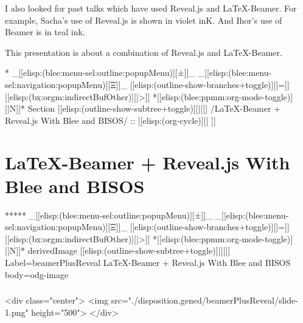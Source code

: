 \begin{whenOrg}
\begin{verblatex}
\begin{frame}[fragile,plain,label=priorArt]
{  I also looked for past talks which have used Reveal.js and LaTeX-Beamer.
  For example, Sacha's use of Reveal.js is shown in violet inK.
  And Ihor's use of Beamer is in teal ink.

  This presentation is about a combination of Reveal.js and LaTeX-Beamer.
}

\end{frame}
\end{verblatex}


\begin{whenOrg}
*  _[[elisp:(blee:menu-sel:outline:popupMenu)][±]]_ _[[elisp:(blee:menu-sel:navigation:popupMenu)][Ξ]]_ [[elisp:(outline-show-branches+toggle)][|=]] [[elisp:(bx:orgm:indirectBufOther)][|>]] *[[elisp:(blee:ppmm:org-mode-toggle)][|N]]*  Section    [[elisp:(outline-show-subtree+toggle)][||]]   /LaTeX-Beamer + Reveal.js With Blee and BISOS/ ::  [[elisp:(org-cycle)][| ]]
\end{whenOrg}

\section{LaTeX-Beamer + Reveal.js With Blee and BISOS}


\begin{whenOrg}
*****  _[[elisp:(blee:menu-sel:outline:popupMenu)][±]]_ _[[elisp:(blee:menu-sel:navigation:popupMenu)][Ξ]]_ [[elisp:(outline-show-branches+toggle)][|=]] [[elisp:(bx:orgm:indirectBufOther)][|>]] *[[elisp:(blee:ppmm:org-mode-toggle)][|N]]*  derivedImage [[elisp:(outline-show-subtree+toggle)][||]] Label=beamerPlusReveal LaTeX-Beamer + Reveal.js With Blee and BISOS body=odg-image
\end{whenOrg}

\begin{htmlonly}

\begin{frame}[fragile,plain,label=beamerPlusReveal]
    \frametitle{}
    \framesubtitle{}
    \begin{rawhtml}
<div class="center">
<img src="./disposition.gened/beamerPlusReveal/slide-1.png" height="500">
</div>
    \end{rawhtml}
\end{frame}
\end{htmlonly}


\end{whenOrg}
